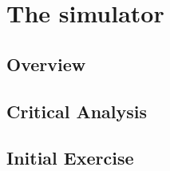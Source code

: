 
%

\chapter{The simulator}
\label{cha:the_simulator}

\section{Overview}
\label{sub:overview}

\section{Critical Analysis}
\label{sub:membership_protocols}

\section{Initial Exercise}
\label{sub:initial_exercise}